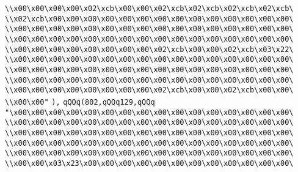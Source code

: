 \verb|\\x00\x00\x00\x00\x02\xcb\x00\x00\x02\xcb\x02\xcb\x02\xcb\x02\xcb\|\newline
\verb|\\x02\xcb\x00\x00\x00\x00\x00\x00\x00\x00\x00\x00\x00\x00\x00\x00\|\newline
\verb|\\x00\x00\x00\x00\x00\x00\x00\x00\x00\x00\x00\x00\x00\x00\x00\x00\|\newline
\verb|\\x00\x00\x00\x00\x00\x00\x00\x00\x00\x00\x00\x00\x00\x00\x00\x00\|\newline
\verb|\\x00\x00\x00\x00\x00\x00\x00\x00\x02\xcb\x00\x00\x02\xcb\x03\x22\|\newline
\verb|\\x00\x00\x00\x00\x00\x00\x00\x00\x00\x00\x00\x00\x00\x00\x00\x00\|\newline
\verb|\\x00\x00\x00\x00\x00\x00\x00\x00\x00\x00\x00\x00\x00\x00\x00\x00\|\newline
\verb|\\x00\x00\x00\x00\x00\x00\x00\x00\x00\x00\x00\x00\x00\x00\x00\x00\|\newline
\verb|\\x00\x00\x00\x00\x00\x00\x00\x00\x02\xcb\x00\x00\x02\xcb\x00\x00\|\newline
\verb|\\x00\x00"|\newline
\verb|),|\newline
\verb|qQQq(802,qQQq129,qQQq|\newline
\verb|"\x00\x00\x00\x00\x00\x00\x00\x00\x00\x00\x00\x00\x00\x00\x00\x00\|\newline
\verb|\\x00\x00\x00\x00\x00\x00\x00\x00\x00\x00\x00\x00\x00\x00\x00\x00\|\newline
\verb|\\x00\x00\x00\x00\x00\x00\x00\x00\x00\x00\x00\x00\x00\x00\x00\x00\|\newline
\verb|\\x00\x00\x00\x00\x00\x00\x00\x00\x00\x00\x00\x00\x00\x00\x00\x00\|\newline
\verb|\\x00\x00\x00\x00\x00\x00\x00\x00\x00\x00\x00\x00\x00\x00\x00\x00\|\newline
\verb|\\x00\x00\x03\x23\x00\x00\x00\x00\x00\x00\x00\x00\x00\x00\x00\x00\|\newline
